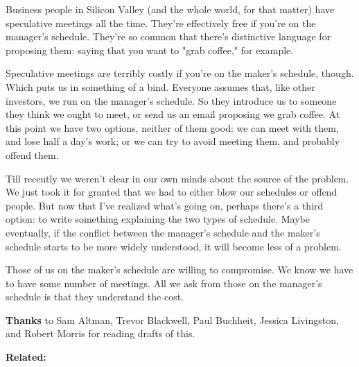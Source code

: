 Business people in Silicon
                    Valley (and the whole world, for that matter) have
                    speculative meetings all the time. They're effectively free
                    if you're on the manager's schedule. They're so common that
                    there's distinctive language for proposing them: saying that
                    you want to "grab coffee," for example.

Speculative
                    meetings are terribly costly if you're on the maker's
                    schedule, though. Which puts us in something of a bind.
                    Everyone assumes that, like other investors, we run on the
                    manager's schedule. So they introduce us to someone they
                    think we ought to meet, or send us an email proposing we
                    grab coffee. At this point we have two options, neither of
                    them good: we can meet with them, and lose half a day's
                    work; or we can try to avoid meeting them, and probably
                    offend them.

Till recently we weren't clear in
                    our own minds about the source of the problem. We just took
                    it for granted that we had to either blow our schedules or
                    offend people. But now that I've realized what's going on,
                    perhaps there's a third option: to write something
                    explaining the two types of schedule. Maybe eventually, if
                    the conflict between the manager's schedule and the maker's
                    schedule starts to be more widely understood, it will become
                    less of a problem.

Those of us on the maker's
                    schedule are willing to compromise. We know we have to have
                    some number of meetings. All we ask from those on the
                    manager's schedule is that they understand the cost.






                    \textbf{Thanks} to Sam Altman, Trevor Blackwell, Paul
                    Buchheit, Jessica Livingston, and Robert Morris for reading
                    drafts of this.



\textbf{Related:}



              
            
          
